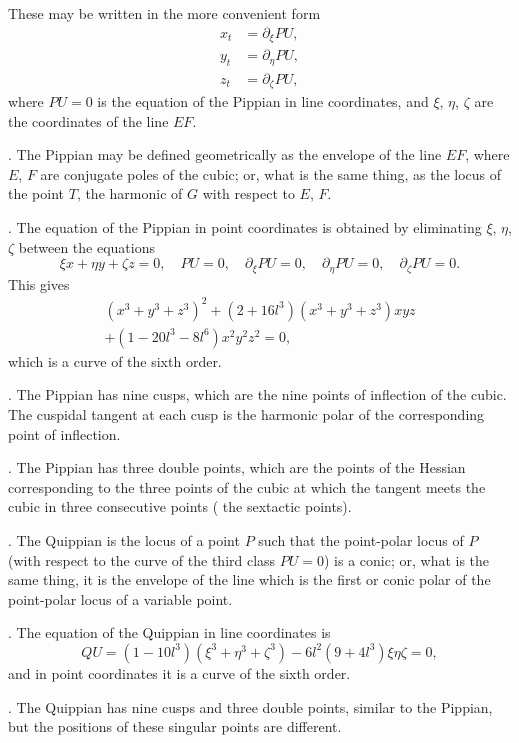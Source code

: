 \documentclass[11pt,a4paper]{book}
\begin{document}
\begin{center}
These may be written in the more convenient form
\begin{align*}
x_{t} &= \partial_{\xi}PU, \\
y_{t} &= \partial_{\eta}PU, \\
z_{t} &= \partial_{\zeta}PU,
\end{align*}
where $PU = 0$ is the equation of the Pippian in line coordinates,
and $\xi$, $\eta$, $\zeta$ are the coordinates of the line $EF$.

. The Pippian may be defined geometrically as the envelope
of the line $EF$, where $E$, $F$ are conjugate poles of the cubic;
or, what is the same thing, as the locus of the point $T$, the
harmonic of $G$ with respect to $E$, $F$.

. The equation of the Pippian in point coordinates is
obtained by eliminating $\xi$, $\eta$, $\zeta$ between the equations
\[
\xi x + \eta y + \zeta z = 0, \quad PU = 0, \quad \partial_{\xi}PU = 0, \quad
\partial_{\eta}PU = 0, \quad \partial_{\zeta}PU = 0.
\]
This gives
\begin{multline*}
(x^{3} + y^{3} + z^{3})^{2} + (2 + 16l^{3})(x^{3} + y^{3} + z^{3})xyz \\
+ (1 - 20l^{3} - 8l^{6})x^{2}y^{2}z^{2} = 0,
\end{multline*}
which is a curve of the sixth order.

. The Pippian has nine cusps, which are the nine points
of inflection of the cubic. The cuspidal tangent at each cusp
is the harmonic polar of the corresponding point of inflection.

. The Pippian has three double points, which are the
points of the Hessian corresponding to the three points of the
cubic at which the tangent meets the cubic in three consecutive
points (\ie{} the sextactic points).

. The Quippian is the locus of a point $P$ such that the
point-polar locus of $P$ (with respect to the curve of the third
class $PU = 0$) is a conic; or, what is the same thing, it is
the envelope of the line which is the first or conic polar of
the point-polar locus of a variable point.

. The equation of the Quippian in line coordinates is
\[
QU = (1 - 10l^{3})(\xi^{3} + \eta^{3} + \zeta^{3}) - 6l^{2}(9 + 4l^{3})\xi\eta\zeta = 0,
\]
and in point coordinates it is a curve of the sixth order.

. The Quippian has nine cusps and three double points,
similar to the Pippian, but the positions of these singular points
are different.


\end{center}
\end{document}
